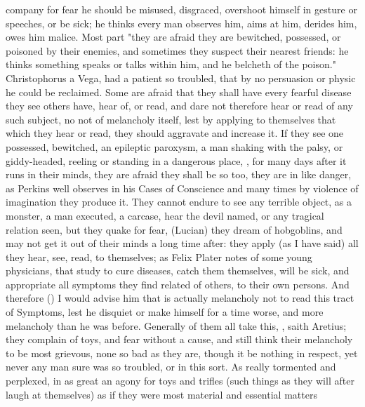 {company for fear he should be misused, disgraced, overshoot himself in gesture
or speeches, or be sick; he thinks every man observes him, aims at him, derides
him, owes him malice. Most part "they are afraid they are
bewitched, possessed, or poisoned by their enemies, and sometimes they suspect
their nearest friends: he thinks something speaks or talks within him, and he
belcheth of the poison." Christophorus a Vega,  had a patient so troubled, that by no persuasion or physic he could
be reclaimed. Some are afraid that they shall have every fearful disease they
see others have, hear of, or read, and dare not therefore hear or read of any
such subject, no not of melancholy itself, lest by applying to themselves that
which they hear or read, they should aggravate and increase it. If they see one
possessed, bewitched, an epileptic paroxysm, a man shaking with the palsy, or
giddy-headed, reeling or standing in a dangerous place, \etc{}, for many days
after it runs in their minds, they are afraid they shall be so too, they are in
like danger, as Perkins  well observes in
his Cases of Conscience and many times by violence of imagination they produce
it. They cannot endure to see any terrible object, as a monster, a man
executed, a carcase, hear the devil named, or any tragical relation seen, but
they quake for fear,  (Lucian) they dream of
hobgoblins, and may not get it out of their minds a long time after: they apply
(as I have said) all they hear, see, read, to themselves; as
Felix Plater notes of some young physicians, that study to
cure diseases, catch them themselves, will be sick, and appropriate all
symptoms they find related of others, to their own persons. And therefore
() I would advise him that
is actually melancholy not to read this tract of Symptoms, lest he disquiet or
make himself for a time worse, and more melancholy than he was before.
Generally of them all take this, , saith Aretius; they complain of toys, and fear
without a cause, and still think their melancholy to be
most grievous, none so bad as they are, though it be nothing in respect, yet
never any man sure was so troubled, or in this sort. As really tormented and
perplexed, in as great an agony for toys and trifles (such things as they will
after laugh at themselves) as if they were most material and essential matters
}
